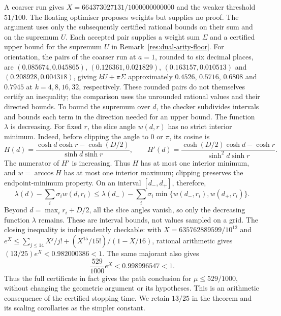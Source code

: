 A coarser run gives $X=664373027131/1000000000000$
and the weaker threshold $51/100$.
The floating optimiser proposes weights but supplies no proof. The
argument uses only the subsequently certified rational bounds on their
sum and on the supremum $U$.  Each accepted
pair supplies a weight sum $\Sigma$ and a certified upper bound for the
supremum $U$ in Remark~\ref{res:dual-arity-floor}. For orientation, the
pairs of the coarser run at $a=1$, rounded to six decimal places, are
$(0.085674,0.045865)$, $(0.126361,0.021829)$, $(0.163157,0.010513)$ and
$(0.208928,0.004318)$, giving $kU+\pi\Sigma$ approximately
$0.4526$, $0.5716$, $0.6808$ and $0.7945$ at $k=4,8,16,32$, respectively.
These rounded pairs do not themselves certify an inequality; the comparison
uses the unrounded rational values and their directed bounds.
To bound the supremum over $d$, the checker subdivides intervals and bounds
each term in the direction needed for an upper bound. The function
$\lambda$ is decreasing. For fixed $r$, the slice angle $w(d,r)$ has no
strict interior minimum. Indeed, before clipping the angle to $0$ or $\pi$,
its cosine is
\[
 H(d)=\frac{\cosh d\cosh r-\cosh(D/2)}{\sinh d\sinh r},\qquad
 H'(d)=\frac{\cosh(D/2)\cosh d-\cosh r}{\sinh^2d\sinh r}.
\]
The numerator of $H'$ is increasing. Thus $H$ has at most one interior
minimum, and $w=\arccos H$ has at most one interior maximum; clipping
preserves the endpoint-minimum property. On an interval $[d_-,d_+]$,
therefore,
\[
 \lambda(d)-\sum_i\sigma_iw(d,r_i)
 \le\lambda(d_-)-\sum_i\sigma_i
       \min\{w(d_-,r_i),w(d_+,r_i)\}.
\]
Beyond $d=\max_i r_i+D/2$, all the slice angles vanish, so only the
decreasing function $\lambda$ remains. These are interval bounds, not
values sampled on a grid.
The closing inequality is independently checkable: with
$X=635762889599/10^{12}$ and
$e^X\le\sum_{j\le14}X^j/j!+(X^{15}/15!)/(1-X/16)$, rational arithmetic gives
$(13/25)e^X<0.982000386<1$. The same majorant also gives
\[
 \frac{529}{1000}e^X<0.998996547<1.
\]
Thus the full certificate in fact gives the path conclusion for
$\mu\le529/1000$, without changing the geometric argument or its hypotheses.
This is an arithmetic consequence of the certified stopping time. We retain $13/25$ in the theorem and its scaling
corollaries as the simpler constant.

